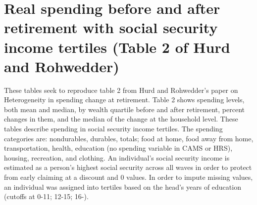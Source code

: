 \documentclass{article}
\begin{document}
\section{Real spending before and after retirement with social security income tertiles (Table 2 of Hurd and Rohwedder)} 
These tables seek to reproduce table 2 from Hurd and Rohwedder's paper on Heterogeneity in spending change at retirement. Table 2 shows spending levels, both mean and median, by wealth quartile before and after retirement, percent changes in them, and the median of the change at the household level. 
\newline
These tables describe spending in social security income tertiles. The spending categories are: nondurables, durables, totals; food at home, food away from home, transportation, health, education (no spending variable in CAMS or HRS), housing, recreation, and clothing.
\newline
An individual’s social security income is estimated as a person's highest social security across all waves in order to protect from early claiming at a discount and 0 values. In order to impute missing values, an individual was assigned into tertiles based on the head's years of education (cutoffs at 0-11; 12-15; 16-).











\end{document}
